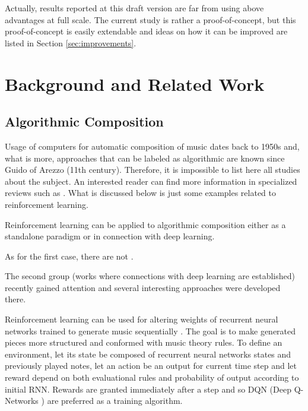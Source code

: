 \documentclass{article}
\begin{document}
Actually, results reported at this draft version are far from using above advantages at full scale. The current study is rather a proof-of-concept, but this proof-of-concept is easily extendable and ideas on how it can be improved are listed in Section \ref{sec:improvements}.


\section{Background and Related Work}
\label{sec:literature}

\subsection{Algorithmic Composition}
\label{subsec:composition}

Usage of computers for automatic composition of music dates back to 1950s and, what is more, approaches that can be labeled as algorithmic are known since Guido of Arezzo (11th century). Therefore, it is impossible to list here all studies about the subject. An interested reader can find more information in specialized reviews such as \cite{fernandez2013ai}. What is discussed below is just some examples related to reinforcement learning.

Reinforcement learning can be applied to algorithmic composition either as a standalone paradigm or in connection with deep learning.

As for the first case, there are not \cite{yi2007automatic}.

The second group (works where connections with deep learning are established) recently gained attention and several interesting approaches were developed there.

Reinforcement learning can be used for altering weights of recurrent neural networks trained to generate music sequentially \cite{jaques2016generating, kotecha2018bach}. The goal is to make generated pieces more structured and conformed with music theory rules. To define an environment, let its state be composed of recurrent neural networks states and previously played notes, let an action be an output for current time step and let reward depend on both evaluational rules and probability of output according to initial RNN. Rewards are granted immediately after a step and so DQN (Deep Q-Networks \cite{mnih2013playing}) are preferred as a training algorithm.
\end{document}
